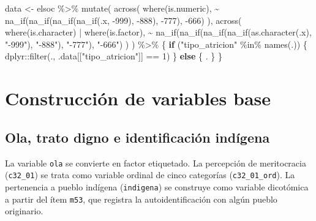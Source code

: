 \documentclass[
  spanish,
  a4paper,
  oneside]{scrbook}
\newenvironment{Shaded}{\begin{snugshade}}{\end{snugshade}}
\newcommand{\ControlFlowTok}[1]{\textcolor[rgb]{0.00,0.23,0.31}{\textbf{#1}}}
\newcommand{\DecValTok}[1]{\textcolor[rgb]{0.68,0.00,0.00}{#1}}
\newcommand{\FunctionTok}[1]{\textcolor[rgb]{0.28,0.35,0.67}{#1}}
\newcommand{\NormalTok}[1]{\textcolor[rgb]{0.00,0.23,0.31}{#1}}
\newcommand{\OtherTok}[1]{\textcolor[rgb]{0.00,0.23,0.31}{#1}}
\newcommand{\SpecialCharTok}[1]{\textcolor[rgb]{0.37,0.37,0.37}{#1}}
\newcommand{\StringTok}[1]{\textcolor[rgb]{0.13,0.47,0.30}{#1}}
\begin{document}
\begin{Shaded}
\begin{Highlighting}[]
\NormalTok{data }\OtherTok{\textless{}{-}}\NormalTok{ elsoc }\SpecialCharTok{\%\textgreater{}\%}
  \FunctionTok{mutate}\NormalTok{(}
    \FunctionTok{across}\NormalTok{(}
      \FunctionTok{where}\NormalTok{(is.numeric),}
      \SpecialCharTok{\textasciitilde{}} \FunctionTok{na\_if}\NormalTok{(}\FunctionTok{na\_if}\NormalTok{(}\FunctionTok{na\_if}\NormalTok{(}\FunctionTok{na\_if}\NormalTok{(.x, }\SpecialCharTok{{-}}\DecValTok{999}\NormalTok{), }\SpecialCharTok{{-}}\DecValTok{888}\NormalTok{), }\SpecialCharTok{{-}}\DecValTok{777}\NormalTok{), }\SpecialCharTok{{-}}\DecValTok{666}\NormalTok{)}
\NormalTok{    ),}
    \FunctionTok{across}\NormalTok{(}
      \FunctionTok{where}\NormalTok{(is.character) }\SpecialCharTok{|} \FunctionTok{where}\NormalTok{(is.factor),}
      \SpecialCharTok{\textasciitilde{}} \FunctionTok{na\_if}\NormalTok{(}\FunctionTok{na\_if}\NormalTok{(}\FunctionTok{na\_if}\NormalTok{(}\FunctionTok{na\_if}\NormalTok{(}\FunctionTok{as.character}\NormalTok{(.x), }\StringTok{"{-}999"}\NormalTok{), }\StringTok{"{-}888"}\NormalTok{), }\StringTok{"{-}777"}\NormalTok{), }\StringTok{"{-}666"}\NormalTok{)}
\NormalTok{    )}
\NormalTok{  ) }\SpecialCharTok{\%\textgreater{}\%}
\NormalTok{  \{}
    \ControlFlowTok{if}\NormalTok{ (}\StringTok{"tipo\_atricion"} \SpecialCharTok{\%in\%} \FunctionTok{names}\NormalTok{(.)) \{}
\NormalTok{      dplyr}\SpecialCharTok{::}\FunctionTok{filter}\NormalTok{(., .data[[}\StringTok{"tipo\_atricion"}\NormalTok{]] }\SpecialCharTok{==} \DecValTok{1}\NormalTok{)}
\NormalTok{    \} }\ControlFlowTok{else}\NormalTok{ \{}
\NormalTok{      .}
\NormalTok{    \}}
\NormalTok{  \}}
\end{Highlighting}
\end{Shaded}

\chapter{Construcción de variables
base}\label{construcciuxf3n-de-variables-base}

\section{Ola, trato digno e identificación
indígena}\label{ola-trato-digno-e-identificaciuxf3n-induxedgena}

La variable \texttt{ola} se convierte en factor etiquetado. La
percepción de meritocracia (\texttt{c32\_01}) se trata como variable
ordinal de cinco categorías (\texttt{c32\_01\_ord}). La pertenencia a
pueblo indígena (\texttt{indigena}) se construye como variable
dicotómica a partir del ítem \texttt{m53}, que registra la
autoidentificación con algún pueblo originario.
\end{document}
